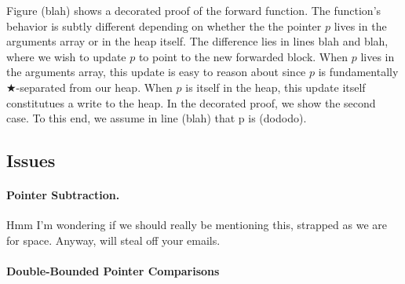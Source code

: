 Figure (blah) shows a decorated proof of the forward function.
The function's behavior is subtly different depending on 
whether the the pointer $p$ lives in the arguments array or in the 
heap itself. The difference lies in lines blah and blah, where 
we wish to update $p$ to point to the new forwarded block. 
When $p$ lives in the arguments array, this update is easy to 
reason about since $p$ is fundamentally $\bigstar$-separated from our heap. 
When $p$ is itself in the heap, this update itself constitutues a
write to the heap. In the decorated proof, we show the second 
case. To this end, we assume in line (blah) that p is (dododo). 



\subsection{Issues}
\label{sec:gccsemantics}

\paragraph{Pointer Subtraction.}
{\color{blue}Hmm I'm wondering if we should really be mentioning this,
strapped as we are for space. Anyway, will steal off your emails.}


\paragraph{Double-Bounded Pointer Comparisons}







